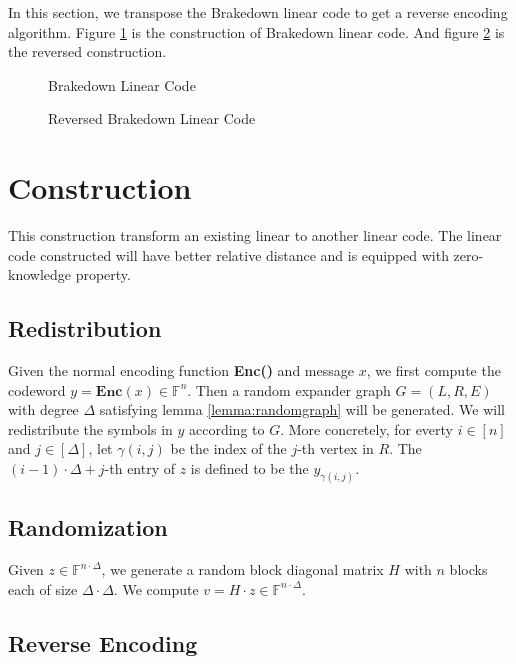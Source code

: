 In this section, we transpose the Brakedown linear code to get a reverse encoding algorithm. Figure \ref{fig:lc} is the construction of Brakedown linear code. And figure \ref{fig:lc-rev} is the reversed construction.


\begin{figure}[h]
\centering

\caption{Brakedown Linear Code}
\label{fig:lc}
\end{figure}



\begin{figure}[h]
\centering

\caption{Reversed Brakedown Linear Code}
\label{fig:lc-rev}
\end{figure}


\section{Construction}

This construction transform an existing linear to another linear code. The linear code constructed will have better relative distance and is equipped with zero-knowledge property.

\subsection{Redistribution}

Given the normal encoding function \textbf{Enc()} and message $x$, we first compute the codeword $y = \textbf{Enc}(x) \in \mathbb{F}^n$. Then a random expander graph $G = (L, R, E)$ with degree $\Delta$ satisfying lemma \ref{lemma:randomgraph} will be generated. We will redistribute the symbols in $y$ according to $G$. More concretely, for everty $i \in [n]$ and $j \in [\Delta]$, let $\gamma(i, j)$ be the index of the $j$-th vertex in $R$. The $(i - 1) \cdot \Delta + j$-th entry of $z$ is defined to be the $y_{\gamma(i, j)}$.

\subsection{Randomization}

Given $z \in \mathbb{F}^{n \cdot \Delta}$, we generate a random block diagonal matrix $H$ with $n$ blocks each of size $\Delta \cdot \Delta$. We compute $v = H \cdot z \in \mathbb{F}^{n \cdot \Delta}$.

\subsection{Reverse Encoding}

